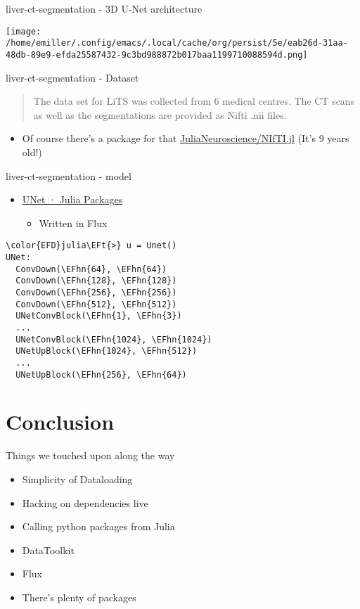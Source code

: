 \documentclass[bigger]{beamer}
\newcommand{\EFt}[1]{\textcolor{EFt}{#1}} %
\newcommand{\EFhn}[1]{\textcolor{EFhn}{\textbf{#1}}} %
\begin{document}
\begin{frame}[label={sec:org760d9ac}]{liver-ct-segmentation - 3D U-Net architecture}
\begin{center}
\texttt{[image: /home/emiller/.config/emacs/.local/cache/org/persist/5e/eab26d-31aa-48db-89e9-efda25587432-9c3bd988872b017baa1199710088594d.png]}
\end{center}
\end{frame}
\begin{frame}[label={sec:org9e8d981}]{liver-ct-segmentation - Dataset}
\begin{quote}
The data set for LiTS was collected from 6 medical centres. The CT scans as well as the segmentations are provided as Nifti .nii files.
\end{quote}

\begin{itemize}
\item Of course there's a package for that \href{https://github.com/JuliaNeuroscience/NIfTI.jl}{JuliaNeuroscience/NIfTI.jl} (It's 9 years
old!)
\end{itemize}
\end{frame}
\begin{frame}[label={sec:orgcd9bc67},fragile]{liver-ct-segmentation - model}
 \begin{itemize}
\item \href{https://juliapackages.com/p/unet}{UNet · Julia Packages}
\begin{itemize}
\item Written in Flux
\end{itemize}
\end{itemize}

\begin{Code}
\begin{Verbatim}
\color{EFD}julia\EFt{>} u = Unet()
UNet:
  ConvDown(\EFhn{64}, \EFhn{64})
  ConvDown(\EFhn{128}, \EFhn{128})
  ConvDown(\EFhn{256}, \EFhn{256})
  ConvDown(\EFhn{512}, \EFhn{512})
  UNetConvBlock(\EFhn{1}, \EFhn{3})
  ...
  UNetConvBlock(\EFhn{1024}, \EFhn{1024})
  UNetUpBlock(\EFhn{1024}, \EFhn{512})
  ...
  UNetUpBlock(\EFhn{256}, \EFhn{64})
\end{Verbatim}
\end{Code}
\end{frame}

\section*{Conclusion}
\label{sec:org6edb6cc}
\begin{frame}[label={sec:org035ba5d}]{Things we touched upon along the way}
\begin{itemize}
\item Simplicity of Dataloading
\item Hacking on dependencies live
\item Calling python packages from Julia
\item DataToolkit
\item Flux
\item There's plenty of packages
\end{itemize}
\end{frame}
\end{document}
